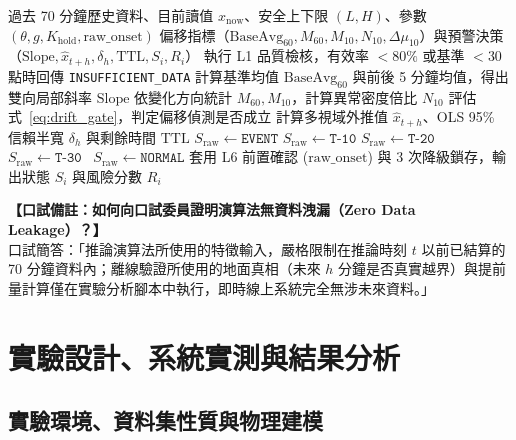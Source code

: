 \documentclass[fontset=none, a4paper, 12pt]{ctexart}
\begin{document}
\begin{doublespace}
\begin{algorithm}[H]
\caption{統一偏移偵測與趨勢預測七層工業硬化演算法 (Unified V1)}
\label{alg:unified_v1}
\begin{algorithmic}[1]
\Require 過去 70 分鐘歷史資料、目前讀值 $x_{\mathrm{now}}$、安全上下限 $(L, H)$、參數 $(\theta, g, K_{\mathrm{hold}}, \text{raw\_onset})$
\Ensure 偏移指標（$\mathrm{BaseAvg}_{60}, M_{60}, M_{10}, N_{10}, \Delta\mu_{10}$）與預警決策（$\mathrm{Slope}, \hat{x}_{t+h}, \delta_h, \mathrm{TTL}, S_i, R_i$）
\State 執行 L1 品質檢核，有效率 $<80\%$ 或基準 $<30$ 點時回傳 \texttt{INSUFFICIENT\_DATA}
\State 計算基準均值 $\mathrm{BaseAvg}_{60}$ 與前後 5 分鐘均值，得出雙向局部斜率 $\mathrm{Slope}$ 
\State 依變化方向統計 $M_{60}, M_{10}$，計算異常密度倍比 $N_{10}$ 
\State 評估式~\eqref{eq:drift_gate}，判定偏移偵測是否成立 
\State 計算多視域外推值 $\hat{x}_{t+h}$、OLS 95\% 信賴半寬 $\delta_h$ 與剩餘時間 $\mathrm{TTL}$ 
 $S_{\mathrm{raw}} \leftarrow \texttt{EVENT}$ 
 $S_{\mathrm{raw}} \leftarrow \texttt{T-10}$
 $S_{\mathrm{raw}} \leftarrow \texttt{T-20}$
 $S_{\mathrm{raw}} \leftarrow \texttt{T-30}$
\Else\ $S_{\mathrm{raw}} \leftarrow \texttt{NORMAL}$
\EndIf
\State 套用 L6 前置確認 ($\text{raw\_onset}$) 與 3 次降級鎖存，輸出狀態 $S_i$ 與風險分數 $R_i$
\end{algorithmic}
\end{algorithm}

\noindent\textbf{【口試備註：如何向口試委員證明演算法無資料洩漏（Zero Data Leakage）？】}\\
口試簡答：「推論演算法所使用的特徵輸入，嚴格限制在推論時刻 $t$ 以前已結算的 70 分鐘資料內；離線驗證所使用的地面真相（未來 $h$ 分鐘是否真實越界）與提前量計算僅在實驗分析腳本中執行，即時線上系統完全無涉未來資料。」

\clearpage
\section{實驗設計、系統實測與結果分析}

\subsection{實驗環境、資料集性質與物理建模}
\label{sec:dataset_and_modeling}


\end{doublespace}
\end{document}
